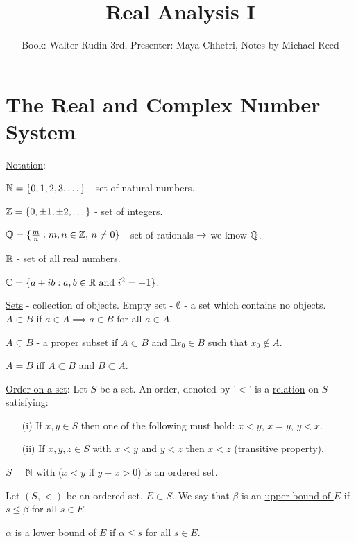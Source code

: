 \documentclass[]{article}
\author{Book: Walter Rudin 3rd, Presenter: Maya Chhetri, Notes by Michael Reed}
\title{Real Analysis I}
\begin{document}
\maketitle


\section{The Real and Complex Number System}

\ul{Notation}: 

$\mathbb{N} = \{0,1,2,3,\dots\}$ - set of natural numbers.

$\mathbb{Z} = \{0,\pm 1, \pm 2,\dots\}$ - set of integers.

$\mathbb{Q} = \{\frac{m}{n}:m,n\in\mathbb{Z},\, n\neq 0\}$ - set of rationals $\rightarrow$ we know $\mathbb{Q}$.

$\mathbb{R}$ - set of all real numbers.

$\mathbb{C} = \{a+ib: a,b\in\mathbb{R} \text{ and } i^2 = -1\}$.

\ul{Sets} - collection of objects. Empty set - $\emptyset$ - a set which contains no objects.
$A\subset B$ if $a\in A \implies a\in B$ for all $a\in A$.
\begin{example}
	$A\varsubsetneq B$ - a proper subset if $A\subset B$ and $\exists x_0 \in B$ such that $x_0 \notin A$.
\end{example}
\begin{note}
	$A = B$ iff $A\subset B$ and $B\subset A$.
\end{note}

\ul{Order on a set}: Let $S$ be a set. An order, denoted by '$<$' is a \ul{relation} on $S$ satisfying:
\begin{enumerate}
	\item[(i)] If $x,y\in S$ then one of the following must hold:
	$x<y$, $x = y$, $y<x$.
	\item[(ii)] If $x,y,z\in S$ with $x<y$ and $y<z$ then $x<z$ (transitive property).
\end{enumerate}
\begin{example}
	$S = \mathbb{N}$ with \say{$<$} ($x<y$ if $y-x>0$) is an ordered set.
\end{example}
\begin{definition}
	 Let $(S,<)$ be an ordered set, $E\subset S$. We say that $\beta$ is an \ul{upper bound of $E$} if $s\leq\beta$ for all $s\in E$.
\end{definition}
\begin{definition}
	 $\alpha$ is a \ul{lower bound of $E$} if $\alpha \leq s$ for all $s\in E$.
\end{definition}
\end{document}
